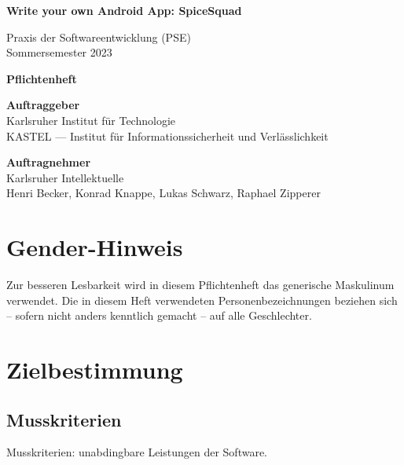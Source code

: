 \documentclass[parskip=full]{scrartcl}
\begin{document}


\begin{titlepage}
    \begin{center}
        \begin{Huge}
            {\textbf{Write your own Android App: SpiceSquad}}
        \end{Huge}
        \vspace{12px}

        Praxis der Softwareentwicklung (PSE)\\
        Sommersemester 2023\\
        \vspace{150px}

        \begin{Huge}
            {\textbf{Pflichtenheft}}
        \end{Huge}
        \vspace{12px}

        \textbf{Auftraggeber}\\
        Karlsruher Institut für Technologie\\
        KASTEL — Institut für Informationssicherheit und Verlässlichkeit\\
        \vspace{330px}

        \textbf{Auftragnehmer}\\
        Karlsruher Intellektuelle\\
        Henri Becker, Konrad Knappe, Lukas Schwarz, Raphael Zipperer\\
    \end{center}
\end{titlepage}

\tableofcontents

\section*{Gender-Hinweis}
Zur besseren Lesbarkeit wird in diesem Pflichtenheft das generische Maskulinum verwendet.
Die in diesem Heft verwendeten Personenbezeichnungen beziehen sich – sofern nicht anders kenntlich gemacht – auf alle Geschlechter.
\newpage

\section{Zielbestimmung}
\subsection{Musskriterien}
Musskriterien: unabdingbare Leistungen der Software.
\end{document}
